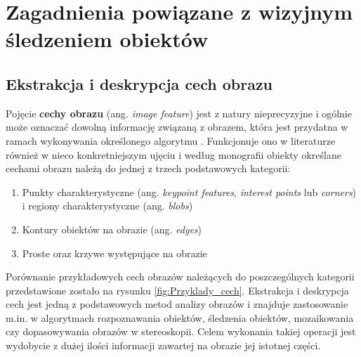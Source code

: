 \chapter{Zagadnienia powiązane z wizyjnym śledzeniem obiektów}
\label{cha:Zagadnienia_powiazane_z_wizyjnym_sledzeniem_obiektow}

\section{Ekstrakcja i deskrypcja cech obrazu}
\label{sec:Ekstrakcja_i_deskrypcja_cech_obrazu}
Pojęcie \textbf{cechy obrazu} (ang. \textit{image feature}) jest z natury nieprecyzyjne i ogólnie może oznaczać dowolną informację związaną z obrazem, która jest przydatna w ramach wykonywania określonego algorytmu \cite{Campoy2009}. Funkcjonuje ono w literaturze również w nieco konkretniejszym ujęciu i według monografii \cite{Szeliski2011} obiekty określane cechami obrazu należą do jednej z trzech podstawowych kategorii:

\begin{enumerate}
	\item Punkty charakterystyczne (ang. \textit{keypoint features}, \textit{interest points} lub \textit{corners}) i regiony charakterystyczne (ang. \textit{blobs})
	\item Kontury obiektów na obrazie (ang. \textit{edges})
	\item Proste oraz krzywe występujące na obrazie
\end{enumerate}

Porównanie przykładowych cech obrazów należących do poszczególnych kategorii przedstawione zostało na rysunku \ref{fig:Przyklady_cech}. Ekstrakcja i deskrypcja cech jest jedną z podstawowych metod analizy obrazów i znajduje zastosowanie m.in. w algorytmach rozpoznawania obiektów, śledzenia obiektów, mozaikowania czy dopasowywania obrazów w stereoskopii. Celem wykonania takiej operacji jest wydobycie z dużej ilości informacji zawartej na obrazie jej istotnej części.

